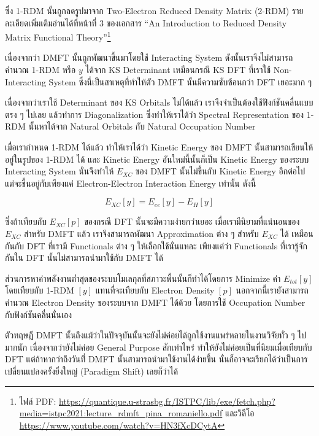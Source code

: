 ซึ่ง 1-RDM นั้นถูกลดรูปมาจาก Two-Electron Reduced Density Matrix (2-RDM) รายละเอียดเพิ่มเติมอ่านได้ที่หน้าที่ 3 ของเอกสาร
\enquote{An Introduction to Reduced Density Matrix Functional Theory}\footnote{ไฟล์ PDF:
  \url{https://quantique.u-strasbg.fr/ISTPC/lib/exe/fetch.php?media=istpc2021:lecture_rdmft_pina_romaniello.pdf}
  และวิดีโอ \url{https://www.youtube.com/watch?v=HN3fXcDCytA}}

เนื่องจากว่า DMFT นั้นถูกพัฒนาขึ้นมาโดยใช้ Interacting System ดังนั้นเราจึงไม่สามารถคำนวณ 1-RDM หรือ $y$ ได้จาก KS Determinant
เหมือนกรณี KS DFT ที่เราใช้ Non-Interacting System ซึ่งนี่เป็นสาเหตุที่ทำให้ตัว DMFT นั้นมีความซับซ้อนกว่า DFT เยอะมาก ๆ

เนื่องจากว่าเราใช้ Determinant ของ KS Orbitals ไม่ได้แล้ว เราจึงจำเป็นต้องใช้ฟังก์ชันคลื่นแบบตรง ๆ ไปเลย แล้วทำการ Diagonalization
ซึ่งทำให้เราได้ว่า Spectral Representation ของ 1-RDM นั้นหาได้จาก Natural Orbitals กับ Natural Occupation Number

เมื่อเรากำหนด 1-RDM ได้แล้ว ทำให้เราได้ว่า Kinetic Energy ของ DMFT นั้นสามารถเขียนให้อยู่ในรูปของ 1-RDM ได้ และ Kinetic Energy
อันใหม่นี้นั้นก็เป็น Kinetic Energy ของระบบ Interacting System นั่นจึงทำให้ $E_{XC}$ ของ DMFT นั้นไม่ขึ้นกับ Kinetic Energy อีกต่อไป
แต่จะขึ้นอยู่กับเพียงแค่ Electron-Electron Interaction Energy เท่านั้น ดังนี้

\begin{equation}
  E_{XC}[y] = E_{ee}[y] - E_{H}[y]
\end{equation}

\noindent ซึ่งถ้าเทียบกับ $E_{XC}[p]$ ของกรณี DFT นั้นจะมีความง่ายกว่าเยอะ เมื่อเรามีนิยามที่แน่นอนของ $E_{XC}$ สำหรับ DMFT แล้ว
เราจึงสามารถพัฒนา Approximation ต่าง ๆ สำหรับ $E_{XC}$ ได้ เหมือนกันกับ DFT ที่เรามี Functionals ต่าง ๆ ให้เลือกใช้นั่นแหละ
เพียงแค่ว่า Functionals ที่เรารู้จักกันใน DFT นั้นไม่สามารถนำมาใช้กับ DMFT ได้

ส่วนการหาค่าพลังงานต่ำสุดของระบบโมเลกุลที่สภาวะพื้นนั้นก็ทำได้โดยการ Minimize ค่า $E_{tot}[y]$ โดยเทียบกับ 1-RDM $[y]$ แทนที่จะเทียบกับ
Electron Density $[p]$ นอกจากนี้เรายังสามารถคำนวณ Electron Density ของระบบจาก DMFT ได้ด้วย โดยการใช้ Occupation Number
กับฟังก์ชันคลื่นนั่นเอง

ตัวทฤษฎี DMFT นั้นถึงแม้ว่าในปัจจุบันนั้นจะยังไม่ค่อยได้ถูกใช้งานแพร่หลายในงานวิจัยทั่ว ๆ ไปมากนัก เนื่องจากว่ายังไม่ค่อย General Purpose
สักเท่าไหร่ ทำให้ยังไม่ค่อยเป็นที่นิยมเมื่อเทียบกับ DFT แต่ถ้าหากว่าถึงวันที่่ DMFT นั้นสามารถนำมาใช้งานได้ง่ายขึ้น นั่นก็อาจจะเรียกได้ว่าเป็นการ%
เปลี่ยนแปลงครั้งยิ่งใหญ่ (Paradigm Shift) เลยก็ว่าได้
